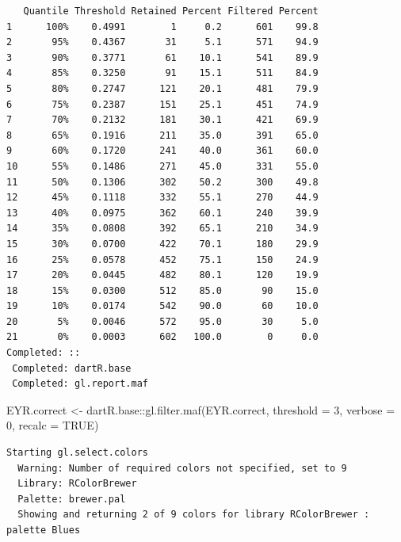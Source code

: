 \documentclass[
  letterpaper,
  DIV=11,
  numbers=noendperiod]{scrreprt}
\newenvironment{Shaded}{\begin{snugshade}}{\end{snugshade}}
\newcommand{\AttributeTok}[1]{\textcolor[rgb]{0.49,0.56,0.16}{#1}}
\newcommand{\ConstantTok}[1]{\textcolor[rgb]{0.53,0.00,0.00}{#1}}
\newcommand{\DecValTok}[1]{\textcolor[rgb]{0.25,0.63,0.44}{#1}}
\newcommand{\FunctionTok}[1]{\textcolor[rgb]{0.02,0.16,0.49}{#1}}
\newcommand{\NormalTok}[1]{\textcolor[rgb]{0.00,0.44,0.13}{#1}}
\newcommand{\OtherTok}[1]{\textcolor[rgb]{0.00,0.44,0.13}{#1}}
\newcommand{\SpecialCharTok}[1]{\textcolor[rgb]{0.25,0.44,0.63}{#1}}
\let\textttOrig\texttt
\renewcommand{\texttt}[1]{\textttOrig{\color{blue}{#1}}}
\begin{document}
\begin{verbatim}
   Quantile Threshold Retained Percent Filtered Percent
1      100%    0.4991        1     0.2      601    99.8
2       95%    0.4367       31     5.1      571    94.9
3       90%    0.3771       61    10.1      541    89.9
4       85%    0.3250       91    15.1      511    84.9
5       80%    0.2747      121    20.1      481    79.9
6       75%    0.2387      151    25.1      451    74.9
7       70%    0.2132      181    30.1      421    69.9
8       65%    0.1916      211    35.0      391    65.0
9       60%    0.1720      241    40.0      361    60.0
10      55%    0.1486      271    45.0      331    55.0
11      50%    0.1306      302    50.2      300    49.8
12      45%    0.1118      332    55.1      270    44.9
13      40%    0.0975      362    60.1      240    39.9
14      35%    0.0808      392    65.1      210    34.9
15      30%    0.0700      422    70.1      180    29.9
16      25%    0.0578      452    75.1      150    24.9
17      20%    0.0445      482    80.1      120    19.9
18      15%    0.0300      512    85.0       90    15.0
19      10%    0.0174      542    90.0       60    10.0
20       5%    0.0046      572    95.0       30     5.0
21       0%    0.0003      602   100.0        0     0.0
Completed: :: 
 Completed: dartR.base 
 Completed: gl.report.maf 
\end{verbatim}

\begin{Shaded}
\begin{Highlighting}[]
\NormalTok{EYR.correct }\OtherTok{\textless{}{-}}\NormalTok{ dartR.base}\SpecialCharTok{::}\FunctionTok{gl.filter.maf}\NormalTok{(EYR.correct, }\AttributeTok{threshold =} \DecValTok{3}\NormalTok{, }\AttributeTok{verbose =} \DecValTok{0}\NormalTok{,}
    \AttributeTok{recalc =} \ConstantTok{TRUE}\NormalTok{)}
\end{Highlighting}
\end{Shaded}

\begin{verbatim}
Starting gl.select.colors 
  Warning: Number of required colors not specified, set to 9
  Library: RColorBrewer
  Palette: brewer.pal
  Showing and returning 2 of 9 colors for library RColorBrewer : palette Blues 
\end{verbatim}

\begin{figure}[H]

{\centering \texttt{[image: Session10\_SexLinkedMarkers\_files/figure-pdf/unnamed-chunk-14-10.pdf]}

}

\end{figure}
\end{document}
